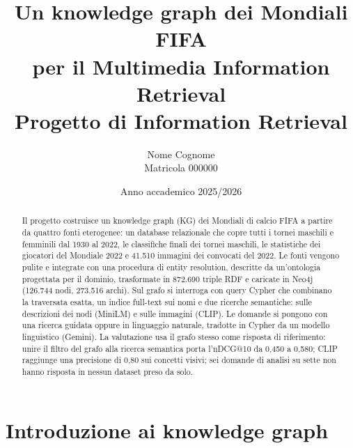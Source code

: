 \documentclass[11pt,a4paper]{article}
\title{\textbf{Un knowledge graph dei Mondiali FIFA\\per il Multimedia Information Retrieval}\\[4pt]
\large Progetto di Information Retrieval}
\author{Nome Cognome \\ \small Matricola 000000} %
\date{Anno accademico 2025/2026}
\begin{document}
\maketitle

\begin{abstract}
\noindent Il progetto costruisce un knowledge graph (KG) dei Mondiali di calcio FIFA a partire da quattro fonti eterogenee: un database relazionale che copre tutti i tornei maschili e femminili dal 1930 al 2022, le classifiche finali dei tornei maschili, le statistiche dei giocatori del Mondiale 2022 e 41.510 immagini dei convocati del 2022. Le fonti vengono pulite e integrate con una procedura di entity resolution, descritte da un'ontologia progettata per il dominio, trasformate in 872.690 triple RDF e caricate in Neo4j (126.744 nodi, 273.516 archi). Sul grafo si interroga con query Cypher che combinano la traversata esatta, un indice full-text sui nomi e due ricerche semantiche: sulle descrizioni dei nodi (MiniLM) e sulle immagini (CLIP). Le domande si pongono con una ricerca guidata oppure in linguaggio naturale, tradotte in Cypher da un modello linguistico (Gemini). La valutazione usa il grafo stesso come risposta di riferimento: unire il filtro del grafo alla ricerca semantica porta l'nDCG@10 da 0,450 a 0,580; CLIP raggiunge una precisione di 0,80 sui concetti visivi; sei domande di analisi su sette non hanno risposta in nessun dataset preso da solo.
\end{abstract}

\clearpage
\tableofcontents
\clearpage

\section{Introduzione ai knowledge graph}
\end{document}

